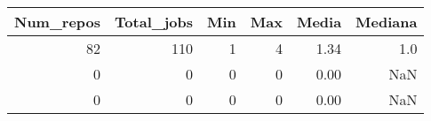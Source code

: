 \begin{tabular}{rrrrrr}
\toprule
 Num\_repos &  Total\_jobs &  Min &  Max &  Media &  Mediana \\
\midrule
        82 &         110 &    1 &    4 &   1.34 &      1.0 \\
         0 &           0 &    0 &    0 &   0.00 &      NaN \\
         0 &           0 &    0 &    0 &   0.00 &      NaN \\
\bottomrule
\end{tabular}

